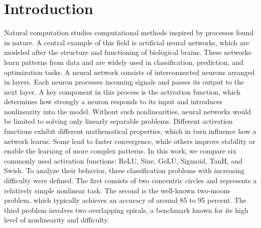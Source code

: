 \documentclass[12pt,fleqn,a4paper]{article}
\begin{document}

\section{Introduction}
Natural computation studies computational methods inspired by processes found in 
nature. A central example of this field is artificial neural networks, which are modeled 
after the structure and functioning of biological brains. These networks learn patterns 
from data and are widely used in classification, prediction, and optimization tasks. 
A neural network consists of interconnected neurons arranged in layers. Each neuron 
processes incoming signals and passes its output to the next layer. A key component in 
this process is the activation function, which determines how strongly a neuron responds 
to its input and introduces nonlinearity into the model. Without such nonlinearities, 
neural networks would be limited to solving only linearly separable problems. 
Different activation functions exhibit different mathematical properties, which in turn 
influence how a network learns. Some lead to faster convergence, while others improve 
stability or enable the learning of more complex patterns. In this work, we compare six 
commonly used activation functions: ReLU, Sine, GeLU, Sigmoid, TanH, and Swish. 
To analyze their behavior, three classification problems with increasing difficulty were 
defined. The first consists of two concentric circles and represents a relatively simple 
nonlinear task. The second is the well-known two-moons problem, which typically 
achieves an accuracy of around 85 to 95 percent. The third problem involves two 
overlapping spirals, a benchmark known for its high level of nonlinearity and difficulty. 
\end{document}
